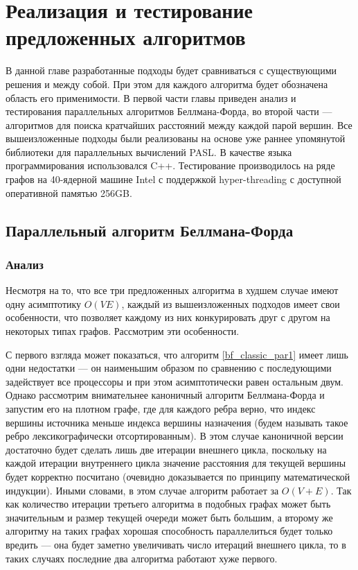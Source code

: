 \chapter{Реализация и тестирование предложенных алгоритмов}

В данной главе разработанные подходы будет сравниваться с существующими решения и между собой. При этом для каждого алгоритма будет обозначена область его применимости. В первой части главы приведен анализ и тестирования параллельных алгоритмов Беллмана-Форда, во второй части --- алгоритмов для поиска кратчайших расстояний между каждой парой вершин. Все вышеизложенные подходы были реализованы на основе уже раннее упомянутой библиотеки для параллельных вычислений PASL. В качестве языка программирования использовался C++. Тестирование производилось на ряде графов на 40-ядерной машине Intel с поддержкой hyper-threading \cite{HYPERTHREADING} с доступной оперативной памятью 256GB. 

\FloatBarrier
\section{Параллельный алгоритм Беллмана-Форда}

\FloatBarrier
\subsection{Анализ}

Несмотря на то, что все три предложенных алгоритма в худшем случае имеют одну асимптотику  $O(VE)$, каждый из вышеизложенных подходов имеет свои особенности, что позволяет каждому из них конкурировать друг с другом на некоторых типах графов. Рассмотрим эти особенности.

С первого взгляда может показаться, что алгоритм \ref{bf_classic_par1} имеет лишь одни недостатки --- он наименьшим образом по сравнению с последующими задействует все процессоры и при этом асимптотически равен остальным двум. Однако рассмотрим внимательнее каноничный алгоритм Беллмана-Форда и запустим его на плотном графе, где для каждого ребра верно, что индекс вершины источника меньше индекса вершины назначения (будем называть такое ребро лексикографически отсортированным). В этом случае каноничной версии достаточно будет сделать лишь две итерации внешнего цикла, поскольку на каждой итерации внутреннего цикла значение расстояния для текущей вершины будет корректно посчитано (очевидно доказывается по принципу математической индукции). Иными словами, в этом случае алгоритм работает за $O(V + E)$. Так как количество итерации третьего алгоритма в подобных графах может быть значительным и размер текущей очереди может быть большим, а второму же алгоритму на таких графах хорошая способность параллелиться будет только вредить --- она будет заметно увеличивать число итераций внешнего цикла, то в таких случаях последние два алгоритма работают хуже первого.   

